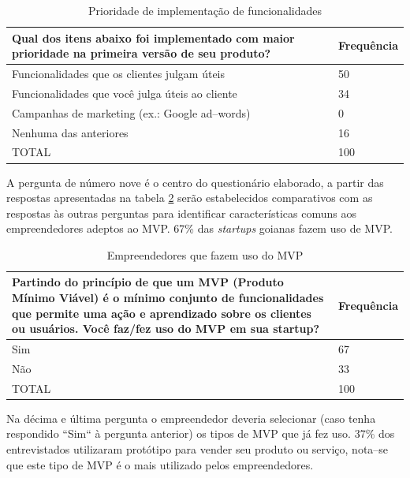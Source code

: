 \begin{table}[hb]
\centering
\caption{Prioridade de implementa\c{c}\~ao de funcionalidades}
\label{tab:pergunta8}
\begin{tabular}{|p{10cm}|p{2cm}|}
\hline{\bf Qual dos itens abaixo foi implementado com maior prioridade na primeira vers\~ao de seu produto?} & {\bf Frequ\^encia}\\
\hline Funcionalidades que os clientes julgam \'uteis & 50\\
\hline Funcionalidades que voc\^e julga \'uteis ao cliente & 34\\
\hline Campanhas de marketing (ex.: Google ad--words) & 0\\
\hline Nenhuma das anteriores & 16\\
\hline TOTAL & 100\\
\hline
\end{tabular}
\end{table}

A pergunta de n\'umero nove \'e o centro do question\'ario elaborado, a partir das respostas apresentadas na tabela \ref{tab:cap4per9} ser\~ao estabelecidos comparativos com as respostas \`as outras perguntas para identificar caracter\'isticas comuns aos empreendedores adeptos ao MVP. 67\% das \emph{startups} goianas fazem uso de MVP.

\begin{table}[hb]
\centering
\caption{Empreendedores que fazem uso do MVP}
\label{tab:cap4per9}
\begin{tabular}{|p{10cm}|p{2cm}|}
\hline{\bf Partindo do princ\'ipio de que um MVP (Produto M\'inimo Vi\'avel) \'e o m\'inimo conjunto de funcionalidades que permite uma a\c{c}\~ao e aprendizado sobre os clientes ou usu\'arios. Voc\^e faz/fez uso do MVP  em sua startup?} & {\bf Frequ\^encia}\\
\hline Sim & 67\\
\hline N\~ao & 33\\
\hline TOTAL & 100\\
\hline
\end{tabular}
\end{table}

\pagebreak

Na d\'ecima e \'ultima pergunta o empreendedor deveria selecionar (caso tenha respondido ``Sim`` \`a pergunta anterior) os tipos de MVP que j\'a fez uso. 37\% dos entrevistados utilizaram prot\'otipo para vender seu produto ou servi\c{c}o, nota--se que este tipo de MVP \'e o mais utilizado pelos empreendedores.

